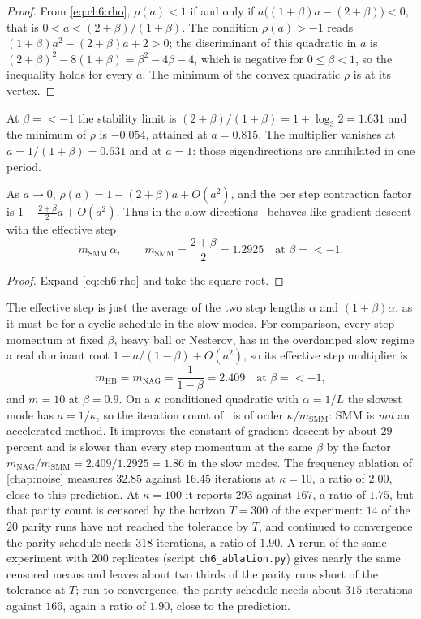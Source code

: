 \begin{proof}
From \eqref{eq:ch6:rho}, $\rho(a)<1$ if and only if $a\bigl((1+\beta)a-(2+\beta)\bigr)<0$,
that is $0<a<(2+\beta)/(1+\beta)$. The condition $\rho(a)>-1$ reads
$(1+\beta)a^2-(2+\beta)a+2>0$; the discriminant of this quadratic in $a$ is
$(2+\beta)^2-8(1+\beta)=\beta^2-4\beta-4$, which is negative for $0\le\beta<1$,
so the inequality holds for every $a$. The minimum of the convex quadratic
$\rho$ is at its vertex.
\end{proof}

At $\beta=\lt-1$ the stability limit is $(2+\beta)/(1+\beta)=1+\log_3 2=1.631$
and the minimum of $\rho$ is $-0.054$, attained at $a=0.815$. The multiplier
vanishes at $a=1/(1+\beta)=0.631$ and at $a=1$: those eigendirections are
annihilated in one period.

\begin{corollary}\label{cor:ch6:slow}
As $a\to0$, $\rho(a)=1-(2+\beta)a+O(a^2)$, and the per step contraction factor
is $1-\tfrac{2+\beta}{2}a+O(a^2)$. Thus in the slow directions \smmdet\ behaves
like gradient descent with the effective step
\[
  m_{\mathrm{SMM}}\,\alpha,\qquad m_{\mathrm{SMM}}=\frac{2+\beta}{2}=1.2925
  \quad\text{at }\beta=\lt-1.
\]
\end{corollary}

\begin{proof}
Expand \eqref{eq:ch6:rho} and take the square root.
\end{proof}

The effective step is just the average of the two step lengths $\alpha$ and
$(1+\beta)\alpha$, as it must be for a cyclic schedule in the slow modes. For
comparison, every step momentum at fixed $\beta$, heavy ball or Nesterov, has
in the overdamped slow regime a real dominant root $1-a/(1-\beta)+O(a^2)$, so its
effective step multiplier is
\[
  m_{\mathrm{HB}}=m_{\mathrm{NAG}}=\frac1{1-\beta}=2.409\quad\text{at }\beta=\lt-1,
\]
and $m=10$ at $\beta=0.9$. On a $\kappa$ conditioned quadratic with $\alpha=1/L$
the slowest mode has $a=1/\kappa$, so the iteration count of \smmdet\ is of
order $\kappa/m_{\mathrm{SMM}}$: SMM is \emph{not} an accelerated method. It
improves the constant of gradient descent by about $29$ percent and is slower
than every step momentum at the same $\beta$ by the factor
$m_{\mathrm{NAG}}/m_{\mathrm{SMM}}=2.409/1.2925=1.86$ in the slow modes.
The frequency ablation of \cref{chap:noise} measures $32.85$ against $16.45$ iterations at $\kappa=10$, a ratio of $2.00$, close to this prediction.
At $\kappa=100$ it reports $293$ against $167$, a ratio of $1.75$, but that parity count is censored by the horizon $T=300$ of the experiment: $14$ of the $20$ parity runs have not reached the tolerance by $T$, and continued to convergence the parity schedule needs $318$ iterations, a ratio of $1.90$. A rerun of the same experiment with $200$ replicates (script \texttt{ch6\_ablation.py}) gives nearly the same censored means and leaves about two thirds of the parity runs short of the tolerance at $T$; run to convergence, the parity schedule needs about $315$ iterations against $166$, again a ratio of $1.90$, close to the prediction.

